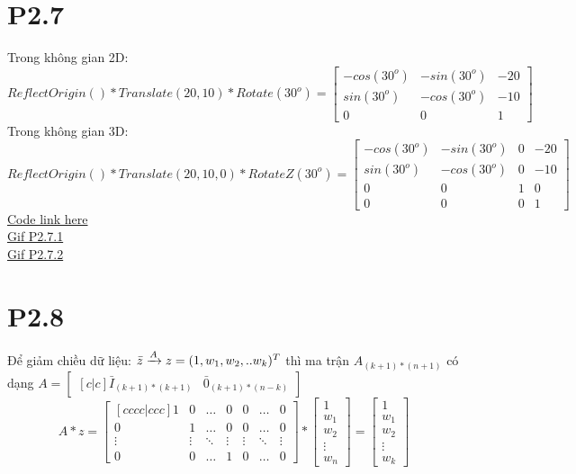 \documentclass[a4paper,11pt]{article}
\theoremstyle{mytheor}
\begin{document}
\section*{P2.7}
Trong không gian 2D:
$$
    \nonumber ReflectOrigin()*Translate(20,10)*Rotate(30^o) = \begin{bmatrix}
        -cos(30^o) & -sin(30^o) & -20 \\
        sin(30^o) & -cos(30^o) & -10 \\
        0 & 0 & 1
    \end{bmatrix}
$$
Trong không gian 3D:
$$
    \nonumber ReflectOrigin()*Translate(20,10,0)*RotateZ(30^o) = \begin{bmatrix}
        -cos(30^o) & -sin(30^o) & 0 & -20 \\
        sin(30^o) & -cos(30^o) & 0 & -10 \\
        0 & 0 & 1 & 0 \\
        0 & 0 & 0 & 1 
    \end{bmatrix}
$$
\href{https://colab.research.google.com/drive/11goRiQbw1PLvmmVFmF0eqNn7gru4-Ozw}{Code link 
here}\\
\href{https://drive.google.com/open?id=1IOk26Iip__HIKyEfTlNXBgDS0Sd6v_dP}{Gif P2.7.1}\\
\href{https://drive.google.com/open?id=1c8WvxVmPRdflaSU3IE3rp4fnA8AFg8kR}{Gif P2.7.2}
\section*{P2.8}
Để giảm chiều dữ liệu: $\Bar{z} \xrightarrow{A} z = (1,w_1,w_2,..w_k)^T$ thì ma trận $A_{(k+1)*(n+1)}$ có dạng
$
    A = \begin{bmatrix}[c|c]
        \bar{I}_{(k+1)*(k+1)} & \bar{0}_{(k+1)*(n-k)}
    \end{bmatrix}
$
$$
    A*z = \begin{bmatrix} [cccc|ccc]
    1 & 0 & \hdots & 0 & 0 & \hdots & 0\\
    0 & 1 & \hdots & 0 & 0 & \hdots & 0\\
    \vdots & \vdots & \ddots & \vdots & \vdots & \ddots & \vdots \\
    0 & 0 & \hdots & 1 & 0 & \hdots & 0
    \end{bmatrix}
    * 
    \begin{bmatrix}
    1\\w_1\\w_2\\ \vdots \\ w_n
    \end{bmatrix} = 
    \begin{bmatrix}
    1\\w_1\\w_2\\ \vdots \\ w_k
    \end{bmatrix}
$$
\end{document}
